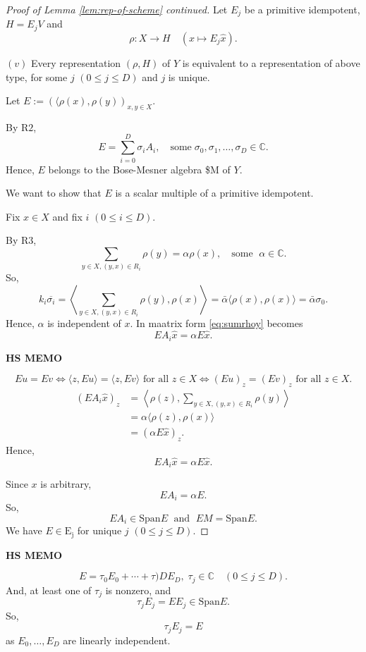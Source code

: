 \documentclass[
]{book}
\theoremstyle{definition}
\theoremstyle{definition}
\theoremstyle{definition}
\theoremstyle{definition}
\theoremstyle{remark}
\begin{document}
\begin{proof}[Proof of Lemma \ref{lem:rep-of-scheme} continued]
Let \(E_j\) be a primitive idempotent, \(H = E_jV\) and
\[\rho: X\to H \quad (x\mapsto E_j\hat{x}).\]

\((v)\) Every representation \((\rho, H)\) of \(Y\) is equivalent to a representation of above type, for some \(j\) \((0\leq j\leq D)\) and \(j\) is unique.

Let \(E:=(\langle \rho(x), \rho(y))_{x,y\in X}\).

By \(\mathrm{R2}\),
\[E = \sum_{i = 0}^D \sigma_i A_i, \quad \text{some}\; \sigma_0, \sigma_1, \ldots, \sigma_D\in \mathbb{C}.\]
Hence, \(E\) belongs to the Bose-Mesner algebra \$M of \(Y\).

We want to show that \(E\) is a scalar multiple of a primitive idempotent.

Fix \(x\in X\) and fix \(i\) \((0\leq i\leq D)\).

By \(\mathrm{R3}\),
\begin{equation}
\sum_{y\in X, (y,x)\in R_i}\rho(y) = \alpha \rho(x), \quad \text{some }\; \alpha\in \mathbb{C}. \label{eq:sumrhoy}
\end{equation}
So,
\[k_i\overline{\sigma_i} = \left\langle \sum_{y\in X, (y,x)\in R_i}\rho(y),\rho(x)\right\rangle = \bar{\alpha}\langle \rho(x), \rho(x)\rangle = \bar{\alpha}\sigma_0.\]
Hence, \(\alpha\) is independent of \(x\). In maatrix form \eqref{eq:sumrhoy} becomes
\[EA_i\hat{x} = \alpha E\hat{x}.\]

\textbf{HS MEMO}

\[Eu = Ev \Leftrightarrow \langle z, Eu\rangle = \langle z, Ev\rangle \text{ for all }z\in X \Leftrightarrow (Eu)_z = (Ev)_z \text{ for all }z\in X.\]
\begin{align}
(EA_i\hat{x})_z & = \left\langle \rho(z), \sum_{y\in X, (y,x)\in R_i}\rho(y)\right\rangle\\
& = \alpha \langle \rho(z), \rho(x)\rangle\\
& = (\alpha E\hat{x})_z.
\end{align}
Hence,
\[EA_i\hat{x} = \alpha E\hat{x}.\]

Since \(x\) is arbitrary,
\[EA_i = \alpha E.\]
So,
\[EA_i \in \mathrm{Span} E\; \text{ and }\; EM = \mathrm{Span} E.\]
We have \(E\in \mathrm{E_j}\) for unique \(j\) \((0\leq j\leq D)\).
\end{proof}

\textbf{HS MEMO}

\[E = \tau_0 E_0 + \cdots + \tau)D E_D, \; \tau_j\in \mathbb{C}\quad (0\leq j\leq D).\]
And, at least one of \(\tau_j\) is nonzero, and
\[\tau_jE_j = EE_j \in \mathrm{Span}E.\]
So,
\[\tau_jE_j = E\]
as \(E_0, \ldots, E_D\) are linearly independent.
\end{document}
